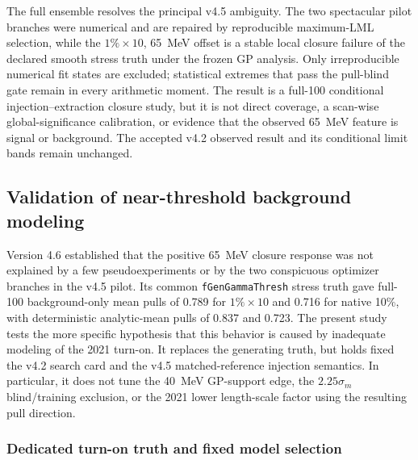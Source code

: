 \clearpage
The full ensemble resolves the principal v4.5 ambiguity.  The two spectacular pilot
branches were numerical and are repaired by reproducible maximum-LML selection, while
the $1\%\times10$, 65~MeV offset is a stable local closure failure of the declared
smooth stress truth under the frozen GP analysis.  Only irreproducible numerical fit
states are excluded; statistical extremes that pass the pull-blind gate remain in every
arithmetic moment.
The result is a full-100 conditional injection--extraction closure study, but it is
not direct \CLs{} coverage, a scan-wise global-significance calibration, or evidence
that the observed 65~MeV feature is signal or background.  The accepted v4.2 observed
result and its conditional limit bands remain unchanged.

\FloatBarrier

\subsection{Validation of near-threshold background modeling}
\label{sec:v4p7-near-threshold-background-modeling}

Version 4.6 established that the positive 65~MeV closure response was not
explained by a few pseudoexperiments or by the two conspicuous optimizer
branches in the v4.5 pilot.  Its common \texttt{fGenGammaThresh} stress truth
gave full-100 background-only mean pulls of 0.789 for $1\%\times10$ and 0.716
for native 10\%, with deterministic analytic-mean pulls of 0.837 and 0.723.
The present study tests the more specific hypothesis that this behavior is
caused by inadequate modeling of the 2021 turn-on.  It replaces the generating
truth, but holds fixed the v4.2 search card and the v4.5 matched-reference
injection semantics.  In particular, it does not tune the 40~MeV GP-support
edge, the $2.25\sigma_m$ blind/training exclusion, or the 2021 lower
length-scale factor using the resulting pull direction.

\subsubsection{Dedicated turn-on truth and fixed model selection}

